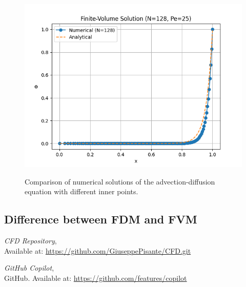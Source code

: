 \documentclass{article}
\begin{document}
\begin{figure}[h!]
\begin{minipage}{0.32\textwidth}
      \label{fig:64}
  \end{minipage} \hfill
  \begin{minipage}{0.32\textwidth}
      \centering
      \includegraphics[width=\textwidth]{FVM_128.png}
      \label{fig:128}
  \end{minipage}
  \caption{Comparison of numerical solutions of the advection-diffusion equation with different inner points.}
  \label{fig:comparison}
\end{figure}

\subsection{Difference between FDM and FVM}






\begin{thebibliography}{9}
    \textit{CFD Repository},\\
    Available at: \url{https://github.com/GiuseppePisante/CFD.git}
    
    \textit{GitHub Copilot},\\
    GitHub. Available at: \url{https://github.com/features/copilot}
  \end{thebibliography}
  
  
\end{document}
